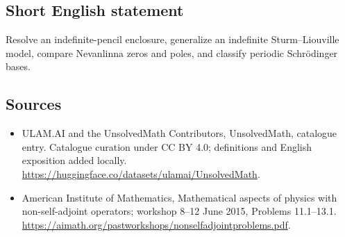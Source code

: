 \documentclass[11pt]{article}
\begin{document}
\subsection{Short English statement}
Resolve an indefinite-pencil enclosure, generalize an indefinite Sturm–Liouville model, compare Nevanlinna zeros and poles, and classify periodic Schrödinger bases.
\subsection{Sources}
\begin{itemize}
\item[\hypertarget{source:statement:1}{S1}] ULAM.AI and the UnsolvedMath Contributors, UnsolvedMath, catalogue entry. Catalogue curation under CC BY 4.0; definitions and English exposition added locally.
\url{https://huggingface.co/datasets/ulamai/UnsolvedMath}.
\item[\hypertarget{source:statement:2}{S2}] American Institute of Mathematics, Mathematical aspects of physics with non-self-adjoint operators; workshop 8–12 June 2015, Problems 11.1–13.1.
\url{https://aimath.org/pastworkshops/nonselfadjointproblems.pdf}.
\end{itemize}
\label{end:statement}
\end{document}
